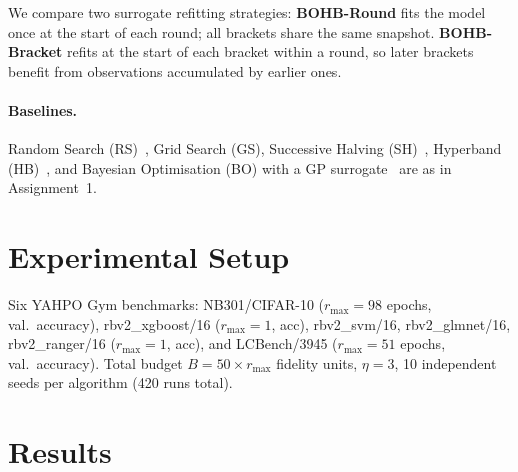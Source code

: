 \documentclass{AIM_report}
\begin{document}
We compare two surrogate refitting strategies:
\textbf{BOHB-Round} fits the model once at the start of each round;
all brackets share the same snapshot.
\textbf{BOHB-Bracket} refits at the start of each bracket within a
round, so later brackets benefit from observations accumulated by
earlier ones.

\paragraph{Baselines.} Random Search (RS)~\cite{bergstra2012random},
Grid Search (GS), Successive Halving (SH)~\cite{jamieson2016non},
Hyperband (HB)~\cite{li2018hyperband}, and Bayesian Optimisation (BO)
with a GP surrogate~\cite{snoek2012practical} are as in Assignment~1.

\section{Experimental Setup}

Six YAHPO Gym benchmarks:
NB301/CIFAR-10 ($r_{\max}{=}98$ epochs, val.\ accuracy),
rbv2\_xgboost/16 ($r_{\max}{=}1$, acc),
rbv2\_svm/16, rbv2\_glmnet/16, rbv2\_ranger/16
($r_{\max}{=}1$, acc), and LCBench/3945 ($r_{\max}{=}51$ epochs,
val.\ accuracy).
Total budget $B{=}50{\times}r_{\max}$ fidelity units, $\eta{=}3$,
10 independent seeds per algorithm (420 runs total).

\section{Results}
\end{document}
